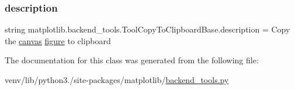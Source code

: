 \subsubsection{\texorpdfstring{description}{description}}
{\footnotesize\ttfamily string matplotlib.\+backend\+\_\+tools.\+Tool\+Copy\+To\+Clipboard\+Base.\+description = \textquotesingle{}Copy the \hyperlink{classmatplotlib_1_1backend__tools_1_1ToolBase_ac96bf482f1c26012fec3fd575e849170}{canvas} \hyperlink{classmatplotlib_1_1backend__tools_1_1ToolBase_af85e83d1db0787aa40d06837204651ee}{figure} to clipboard\textquotesingle{}\hspace{0.3cm}{\ttfamily [static]}}



The documentation for this class was generated from the following file\+:\begin{DoxyCompactItemize}
\item 
venv/lib/python3./site-\/packages/matplotlib/\hyperlink{backend__tools_8py}{backend\+\_\+tools.\+py}\end{DoxyCompactItemize}
